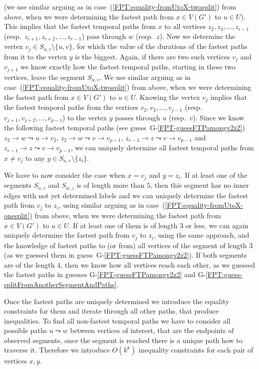 \documentclass[a4paper,UKenglish,cleveref, autoref, thm-restate]{lipics-v2021}
\begin{document}
\begin{enumerate}[(i)]
(we use similar arguing as in case~(\ref{FPT:equality-fromUtoX-twosplit}) from above, when we were determining the fastest path from $x \in V(G')$ to $u \in U$).
This implies that the fastest temporal paths from $x$ to all vertices $z_2, z_3, \dots, z_{i-1}$ (resp.~$z_{i+1}, z_{i+2}, \dots, z_{r-1}$)  pass through $w$ (resp.~$z$).
Now we determine the vertex $v_j \in S_{u,v} \setminus \{u,v\}$,
for which the value of the durations of the fastest paths from it to the vertex $y$ is the biggest.
Again, if there are two such vertices $v_{j}$ and $v_{j+1}$ we know exactly how the fastest temporal paths, starting in these two vertices,
leave the segment $S_{u,v}$. 
We use similar arguing as in case~(\ref{FPT:equality-fromUtoX-twosplit}) from above, when we were determining the fastest path from $x \in V(G')$ to $u \in U$.
Knowing the vertex $v_j$
implies that the fastest temporal paths from the vertices $v_2, v_2, \dots, v_{j-1}$ (resp.~$v_{j+1}, v_{j+2}, \dots, v_{p-1}$) to the vertex $y$ passes through $u$ (resp.~$v$).
Since we know the following fastest temporal paths (see guess~G-\ref{FPT-guessFTPamongv2z2}) 
$z_2 \rightarrow w \leadsto u \rightarrow v_2$,
$z_2 \rightarrow w \leadsto v \rightarrow v_{p-1}$,
$z_{r-1} \rightarrow z \leadsto v \rightarrow v_{p-1}$ and
$z_{r-1} \rightarrow z \leadsto v \rightarrow v_{p-1}$,
we can uniquely determine all fastest temporal paths from $x \neq v_j$ to any $y \in S_{u,v} \setminus \{z_i\}$.

We have to now consider the case when 
$x = v_j$ and $y = z_i$.
If at least one of the segments $S_{u,v}$ and $S_{w,z}$ is of length more than $5$,
then this segment has no inner edges with not yet determined labels
and
we can uniquely determine the fastest path from $v_j$ to $z_i$,
using 
similar arguing as in case~(\ref{FPT:equality-fromUtoX-onesplit}) from above, when we were determining the fastest path from $x \in V(G')$ to $u \in U$.
If at least one of them is of length $3$ or less,
we can again uniquely determine the fastest path from $v_j$ to $z_i$, using the same approach, 
and the knowledge of fastest paths to (or from) all vertices of the segment of length $3$
(as we guessed them in guess~G-\ref{FPT-guessFTPamongv2z2}).
If both segments are of the length $4$, then we know how all vertices reach each other,
as we guessed the fastest paths in guesses G-\ref{FPT-guessFTPamongv2z2} and G-\ref{FPT:guess-splitFromAnotherSegmentAndPaths}.
\end{enumerate}
Once the fastest paths are uniquely determined we introduce the equality constraints for them
and iterate through all other paths, that produce inequalities.
To find all non-fastest temporal paths we have to consider all possible paths $u \leadsto w$ between vertices of interest, that are the endpoints of observed segments,
once the segment is reached there is a unique path how to traverse it.
Therefore we introduce $O(k^k)$ inequality constraints for each pair of vertices $x,y$.
\end{document}
